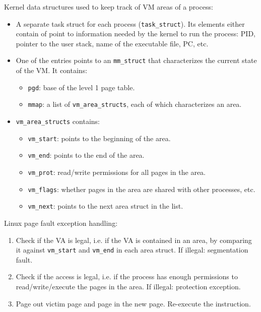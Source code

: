 Kernel data structures used to keep track of VM areas of a process:
\begin{itemize}
\item A separate task struct for each process (\texttt{task\_struct}). Its elements either contain of point to information needed by the kernel to run the process: PID, pointer to the user stack, name of the executable file, PC, etc.
\item One of the entries points to an \texttt{mm\_struct} that characterizes the current state of the VM. It contains:
\begin{itemize}
	\item \texttt{pgd}: base of the level 1 page table.
	\item \texttt{mmap}: a list of \texttt{vm\_area\_structs}, each of which characterizes an area. 
\end{itemize}
\item \texttt{vm\_area\_structs} contains:
\begin{itemize}
	\item \texttt{vm\_start}: points to the beginning of the area.
	\item \texttt{vm\_end}: points to the end of the area.
	\item \texttt{vm\_prot}: read/write permissions for all pages in the area.
	\item \texttt{vm\_flags}: whether pages in the area are shared with other processes, etc.
	\item \texttt{vm\_next}: points to the next area struct in the list.
\end{itemize}
\end{itemize}

Linux page fault exception handling:
\begin{enumerate}
\item Check if the VA is legal, i.e. if the VA is contained in an area, by comparing it against \texttt{vm\_start} and \texttt{vm\_end} in each area struct. If illegal: segmentation fault.
\item Check if the access is legal, i.e. if the process has enough permissions to read/write/execute the pages in the area. If illegal: protection exception.
\item Page out victim page and page in the new page. Re-execute the instruction.
\end{enumerate}
